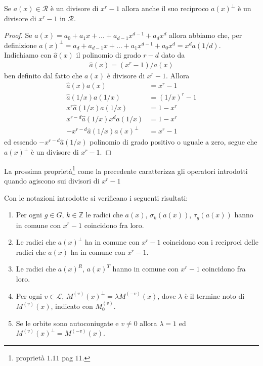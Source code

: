 \begin{prop}\label{prop:reciprocoISdivisore}
   Se $a(x)\in \mathcal{R}$ è un divisore di $x^r - 1$ allora anche il suo reciproco $a(x)^{\perp}$ è un divisore di $x^r-1$ in $\mathcal{R}$.
\end{prop}
\begin{proof}
   Se $a(x) = a_{0} + a_{1}x + \dots + a_{d-1}x^{d-1} + a_{d}x^{d}$ allora abbiamo che, per definizione $a(x)^{\perp} = a_{d} + a_{d-1}x + \dots +  a_{1} x^{d-1} + a_{0}x^{d} = x^{d} a(1/d)$.\\
   Indichiamo con $\hat{a}(x)$ il polinomio di grado $r-d$ dato da 
   \begin{align*}
      \hat{a}(x) = (x^r - 1)/a(x)
   \end{align*}
   ben definito dal fatto che $a(x)$ è divisore di $x^r - 1$. Allora
   \begin{align*}
       \hat{a}(x)a(x) &= x^r - 1 \\
       \hat{a}(1/x)a(1/x) &= (1/x)^r - 1 \\
       x^{r} \hat{a}(1/x)a(1/x) &= 1-x^r \\
       x^{r-d} \hat{a}(1/x)x^{d} a(1/x) &= 1-x^r \\
       -x^{r-d} \hat{a}(1/x) a(x)^{\perp} &= x^r - 1 
   \end{align*}
   ed essendo $-x^{r-d} \hat{a}(1/x)$ polinomio di grado positivo o uguale a zero, segue che $a(x)^{\perp}$ è un divisore di $x^r - 1$.
\end{proof}
La prossima proprietà\footnote{\cite{cerruti} proprietà $1.11$ pag $11$.} come la precedente
caratterizza gli operatori introdotti quando agiscono sui divisori di $x^r - 1$
\begin{prop} \label{prop:multiplaOperatori} 
    Con le notazioni introdotte si verificano i seguenti risultati:
   \begin{enumerate} 
      \item \label{cap3:punto2} Per ogni $g \in G$, $k \in \mathbb{Z}$ le radici che $a(x)$, $\sigma_{k}(a(x))$, $\tau_{g}(a(x))$ hanno in comune con $x^r -1$ coincidono fra loro. 
      \item \label{cap3:punto3} Le radici che $a(x)^{\perp}$ ha in comune con $x^r -1$ coincidono con i reciproci delle radici che $a(x)$ ha in comune con $x^r - 1$.
      \item \label{cap3:punto4} Le radici che $a(x)^{R}$, $a(x)^{T}$ hanno in comune con $x^r -1$ coincidono fra loro.
      \item \label{cap3:punto5} Per ogni $v\in \mathscr{L}$, $M^{(v)}(x)^{\perp} = \lambda M^{(-v)}(x)$, dove $\lambda$ è il termine noto di $M^{(v)}(x)$, indicato con $M_{0}^{(v)}$.
      \item \label{cap3:punto6} Se le orbite sono autoconiugate e $v\neq 0$ allora $\lambda = 1$ ed $M^{(v)}(x)^{\perp} = M^{(-v)}(x)$. 
   \end{enumerate}
\end{prop}
